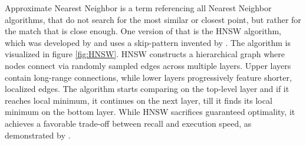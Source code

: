 Approximate Nearest Neighbor is a term referencing all Nearest Neighbor algorithms, that do not search for the most similar or closest point, but rather for the match that is close enough. One version of that is the HNSW algorithm, which was developed by \cite{Malkov.2014} and uses a skip-pattern invented by \cite{Pugh.1990}. The algorithm is visualized in figure \ref{fig:HNSW}. HNSW constructs a hierarchical graph where nodes connect via randomly sampled edges across multiple layers. Upper layers contain long-range connections, while lower layers progressively feature shorter, localized edges. The algorithm starts comparing on the top-level layer and if it reaches local minimum, it continues on the next layer, till it finds its local minimum on the bottom layer. While HNSW sacrifices guaranteed optimality, it achieves a favorable trade-off between recall and execution speed, as demonstrated by \cite{ErikBernhardsson.22.01.2025}.

